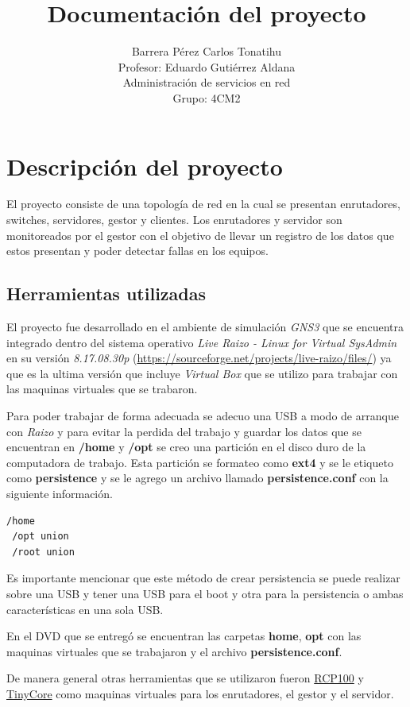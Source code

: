 \documentclass[12pt, titlepage]{article}
\title{}
\title{Documentación del proyecto}
\author{Barrera Pérez Carlos Tonatihu \\ Profesor: Eduardo Gutiérrez Aldana \\ Administración de servicios en red \\ Grupo: 4CM2 }
\begin{document}
\maketitle
\newpage
\tableofcontents
\newpage

\section{Descripción del proyecto}
El proyecto consiste de una topología de red en la cual se presentan enrutadores, switches, servidores, gestor y clientes. Los enrutadores y servidor son monitoreados por el gestor con el objetivo de llevar un registro de los datos que estos presentan y poder detectar fallas en los equipos.

\subsection{Herramientas utilizadas}
El proyecto fue desarrollado en el ambiente de simulación \emph{GNS3} que se encuentra integrado dentro del sistema operativo \emph{Live Raizo - Linux for Virtual SysAdmin} en su versión \emph{8.17.08.30p} (\url{https://sourceforge.net/projects/live-raizo/files/}) ya que es la ultima versión que incluye \emph{Virtual Box} que se utilizo para trabajar con las maquinas virtuales que se trabaron.

Para poder trabajar de forma adecuada se adecuo una USB a modo de arranque con \emph{Raizo} y para evitar la perdida del trabajo y guardar los datos que se encuentran en \textbf{/home} y \textbf{/opt} se creo una partición en el disco duro de la computadora de trabajo. Esta partición se formateo como \textbf{ext4} y se le etiqueto como \textbf{persistence} y se le agrego un archivo llamado \textbf{persistence.conf} con la siguiente información.

\begin{lstlisting}[language=bash]
 /home
 /opt union
 /root union
\end{lstlisting}

Es importante mencionar que este método de crear persistencia se puede realizar sobre una USB y tener una USB para el boot y otra para la persistencia o ambas características en una sola USB.

En el DVD que se entregó se encuentran las carpetas \textbf{home}, \textbf{opt} con las maquinas virtuales que se trabajaron y el archivo \textbf{persistence.conf}.

De manera general otras herramientas que se utilizaron fueron \href{http://rcp100.sourceforge.net/}{RCP100} y \href{https://distro.ibiblio.org/tinycorelinux/}{TinyCore} como maquinas virtuales para los enrutadores, el gestor y el servidor.
\newpage
\end{document}
